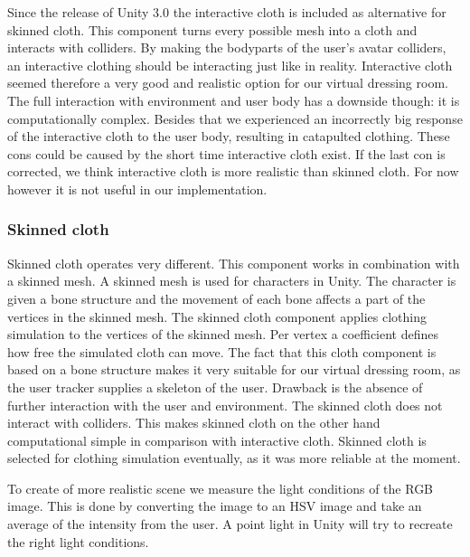 \documentclass[a4paper]{article}
\begin{document}
Since the release of Unity 3.0 the interactive cloth is included as alternative for skinned cloth. This component turns every possible mesh into a cloth and interacts with colliders. By making the bodyparts of the user's avatar colliders, an interactive clothing should be interacting just like in reality. Interactive cloth seemed therefore a very good and realistic option for our virtual dressing room. The full interaction with environment and user body has a downside though: it is computationally complex. Besides that we experienced an incorrectly big response of the interactive cloth to the user body, resulting in catapulted clothing. These cons could be caused by the short time interactive cloth exist. If the last con is corrected, we think interactive cloth is more realistic than skinned cloth. For now however it is not useful in our implementation.

\subsubsection{Skinned cloth}

Skinned cloth operates very different. This component works in combination with a skinned mesh. A skinned mesh is used for characters in Unity. The character is given a bone structure and the movement of each bone affects a part of the vertices in the skinned mesh. The skinned cloth component applies clothing simulation to the vertices of the skinned mesh. Per vertex a coefficient defines how free the simulated cloth can move. The fact that this cloth component is based on a bone structure makes it very suitable for our virtual dressing room, as the user tracker supplies a skeleton of the user. Drawback is the absence of further interaction with the user and environment. The skinned cloth does not interact with colliders. This makes skinned cloth on the other hand computational simple in comparison with interactive cloth. Skinned cloth is selected for clothing simulation eventually, as it was more reliable at the moment.

To create of more realistic scene we measure the light conditions of the RGB image. This is done by converting the image to an HSV image and take an average of the intensity from the user.
A point light in Unity will try to recreate the right light conditions.
\end{document}
